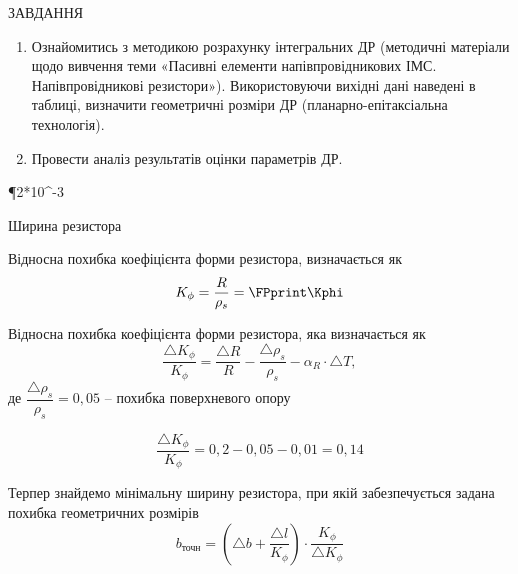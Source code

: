\documentclass[a4paper,14pt]{extreport}
\begin{document}
\begin{center}ЗАВДАННЯ\end{center}

\begin{enumerate}
  \item Ознайомитись з методикою розрахунку інтегральних ДР (методичні
  матеріали щодо вивчення теми «Пасивні елементи напівпровідникових
  ІМС. Напівпровідникові резистори»). Використовуючи вихідні дані
  наведені в таблиці, визначити геометричні розміри ДР (планарно-епітаксіальна технологія).
  \item Провести аналіз результатів оцінки параметрів ДР.
\end{enumerate}


\FPeval{}
\FPeval{} %
\FPeval{}
\FPeval\P {2*10^{-3}}
\FPeval{}
\FPeval{}
\FPeval{} 

\FPeval{}
\FPeval{}
\FPeval{}
\FPeval{}

\FPeval{}
\FPeval{}


\begin{center}
  Ширина резистора
\end{center}

Відносна похибка коефіцієнта форми резистора, визначається як\\
 \FPeval{}
\begin{equation}
  K_{\phi} = \dfrac{R}{\rho_s} =   \FPprint\Kphi 
\end{equation}

Відносна похибка коефіцієнта форми резистора, яка визначається як
\begin{equation}
  \dfrac{\triangle K_{\phi}}{K_{\phi}} = \dfrac{\triangle R}{R} -
  \dfrac{\triangle \rho_s}{\rho_s} - \alpha_R \cdot \triangle T,
\end{equation}
де $\dfrac{\triangle \rho_s}{\rho_s} = 0,05$ -- похибка поверхневого опору


$$\dfrac{\triangle K_{\phi}}{K_{\phi}} = 0,2 - 0,05-0,01 = 0,14$$


Терпер знайдемо мінімальну ширину резистора, при якій 
забезпечується задана похибка геометричних розмірів\\
\begin{equation}
  b_{\text{точн}} = \left( \triangle b + \dfrac{\triangle l}{K_{\phi}}\right) \cdot \dfrac{K_{\phi}}{\triangle K_{\phi}}
\end{equation}
\end{document}

